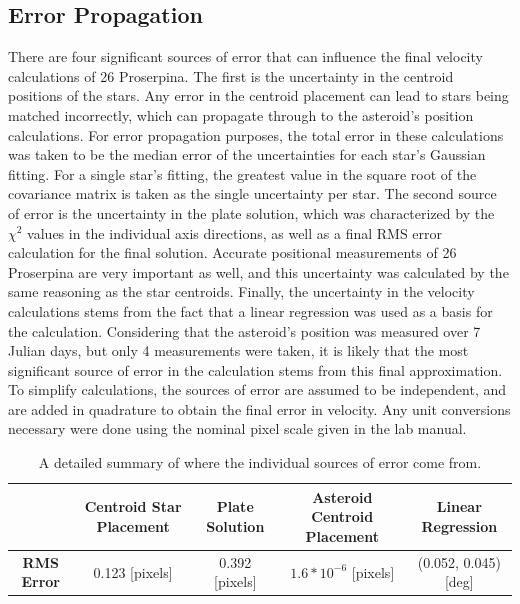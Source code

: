 \documentclass{article}
\begin{document}
\subsection{Error Propagation}
There are four significant sources of error that can influence the final velocity calculations of 26 Proserpina. The first is the uncertainty in the centroid positions of the stars. Any error in the centroid
placement can lead to stars being matched incorrectly, which can propagate through to the asteroid's position calculations. For error propagation purposes, the total error in these calculations was taken to be the median error
of the uncertainties for each star's Gaussian fitting. For a single star's fitting, the greatest value in the square root of the covariance matrix is taken as the single uncertainty per star. 
The second source of error is the uncertainty in the plate solution, which was characterized by the $\chi^2$ values in the individual axis directions, as well as a final RMS error calculation for the final solution. Accurate positional
measurements of 26 Proserpina are very important as well, and this uncertainty was calculated by the same reasoning as the star centroids. Finally, the uncertainty in the velocity calculations stems from the fact that a linear
regression was used as a basis for the calculation. Considering that the asteroid's position was measured over 7 Julian days, but only 4 measurements were taken, it is likely that the most significant source of error in the calculation stems from this 
final approximation. To simplify calculations, the sources of error are assumed to be independent, and are added in quadrature to obtain the final error in velocity. Any unit conversions necessary were done using the nominal pixel scale given in the lab 
manual. 


\begin{table}[H]
    \hspace{0cm}
    \begin{tabular}{c|c|c|c|c|}
        \hline
        & \textbf{Centroid Star Placement} & \textbf{Plate Solution} & \textbf{Asteroid Centroid Placement} & \textbf{Linear Regression} \\
        \hline
        \textbf{RMS Error} & 0.123 [pixels] & 0.392 [pixels] &  $1.6*10^{-6}$ [pixels] & (0.052, 0.045) [deg] \\
        \hline
    \end{tabular}
    \caption{A detailed summary of where the individual sources of error come from.}
    \label{tab:table_label}
\end{table}
\end{document}
